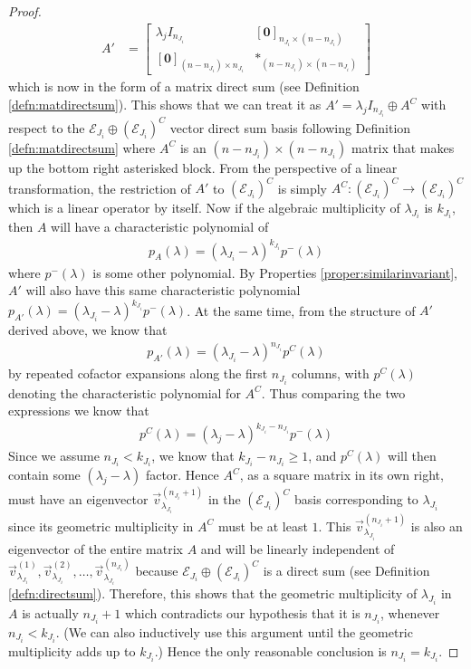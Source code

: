 \begin{proof}
\begin{align*}
A' &=  
\begin{bmatrix}
\lambda_j I_{n_{J_i}} & [\textbf{0}]_{n_{J_i}\times(n-n_{J_i})} \\
[\textbf{0}]_{(n-n_{J_i})\times n_{J_i}} & *_{(n-n_{J_i})\times(n-n_{J_i})}
\end{bmatrix}
\end{align*}
which is now in the form of a matrix direct sum (see Definition \ref{defn:matdirectsum}). This shows that we can treat it as $A' = \lambda_j I_{n_{J_i}} \oplus A^C$ with respect to the $\mathcal{E}_{J_i} \oplus (\mathcal{E}_{J_i})^C$ vector direct sum basis following Definition \ref{defn:matdirectsum} where $A^C$ is an $(n-n_{J_i})\times(n-n_{J_i})$ matrix that makes up the bottom right asterisked block. From the perspective of a linear transformation, the restriction of $A'$ to $(\mathcal{E}_{J_i})^C$ is simply $A^C: (\mathcal{E}_{J_i})^C \to (\mathcal{E}_{J_i})^C$ which is a linear operator by itself. Now if the algebraic multiplicity of $\lambda_{J_i}$ is $k_{J_i}$, then $A$ will have a characteristic polynomial of 
\begin{align*}
p_A(\lambda) = (\lambda_{J_i}-\lambda)^{k_{J_i}} p^-(\lambda)    
\end{align*} where $p^-(\lambda)$ is some other polynomial. By Properties \ref{proper:similarinvariant}, $A'$ will also have this same characteristic polynomial $p_{A'}(\lambda) = (\lambda_{J_i}-\lambda)^{k_{J_i}} p^-(\lambda)$. At the same time, from the structure of $A'$ derived above, we know that 
\begin{align*}
p_{A'}(\lambda) = (\lambda_{J_i}-\lambda)^{n_{J_i}} p^C(\lambda)    
\end{align*} by repeated cofactor expansions along the first $n_{J_i}$ columns, with $p^C(\lambda)$ denoting the characteristic polynomial for $A^C$. Thus comparing the two expressions we know that 
\begin{align*}
p^C(\lambda) = (\lambda_j-\lambda)^{k_{J_i} - n_{J_i}}p^-(\lambda)    
\end{align*} Since we assume $n_{J_i} < k_{J_i}$, we know that $k_{J_i} - n_{J_i} \geq 1$, and $p^C(\lambda)$ will then contain some $(\lambda_j-\lambda)$ factor. Hence $A^C$, as a square matrix in its own right, must have an eigenvector $\vec{v}^{(n_{J_i}+1)}_{\lambda_{J_i}}$ in the $(\mathcal{E}_{J_i})^C$ basis corresponding to $\lambda_{J_i}$ since its geometric multiplicity in $A^C$ must be at least $1$. This $\vec{v}^{(n_{J_i}+1)}_{\lambda_{J_i}}$ is also an eigenvector of the entire matrix $A$ and will be linearly independent of $\vec{v}^{(1)}_{\lambda_{J_i}}, \vec{v}^{(2)}_{\lambda_{J_i}}, \ldots, \vec{v}^{(n_{J_i})}_{\lambda_{J_i}}$ because $\mathcal{E}_{J_i} \oplus (\mathcal{E}_{J_i})^C$ is a direct sum (see Definition \ref{defn:directsum}). Therefore, this shows that the geometric multiplicity of $\lambda_{J_i}$ in $A$ is actually $n_{J_i}+1$ which contradicts our hypothesis that it is $n_{J_i}$, whenever $n_{J_i} < k_{J_i}$. (We can also inductively use this argument until the geometric multiplicity adds up to $k_{J_i}$.) Hence the only reasonable conclusion is $n_{J_i} = k_{J_i}$. 
\end{proof}
